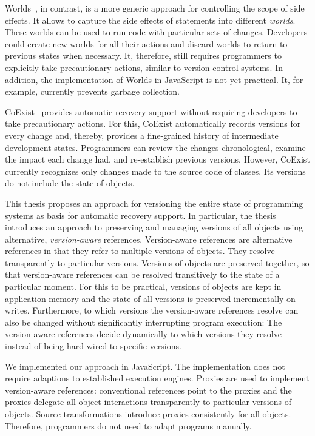 Worlds~\cite{Warth2011Wor}, in contrast, is a more generic approach for controlling the scope of side effects.
It allows to capture the side effects of statements into different \emph{worlds}.
These worlds can be used to run code with particular sets of changes.
Developers could create new worlds for all their actions and discard worlds to return to previous states when necessary.
It, therefore, still requires programmers to explicitly take precautionary actions, similar to version control systems.
In addition, the implementation of Worlds in JavaScript is not yet practical.
It, for example, currently prevents garbage collection.

CoExist~\cite{Steinert2012COE,Steinert2014EVA} provides automatic recovery support without requiring developers to take precautionary actions.
For this, CoExist automatically records versions for every change and, thereby, provides a fine-grained history of intermediate development states.
Programmers can review the changes chronological, examine the impact each change had, and re-establish previous versions.
However, CoExist currently recognizes only changes made to the source code of classes.
Its versions do not include the state of objects.

This thesis proposes an approach for versioning the entire state of programming systems as basis for automatic recovery support.
In particular, the thesis introduces an approach to preserving and managing versions of all objects using alternative, \emph{version-aware} references.
Version-aware references are alternative references in that they refer to multiple versions of objects.
They resolve transparently to particular versions.
Versions of objects are preserved together, so that version-aware references can be resolved transitively to the state of a particular moment.
For this to be practical, versions of objects are kept in application memory and the state of all versions is preserved incrementally on writes.
Furthermore, to which versions the version-aware references resolve can also be changed without significantly interrupting program execution:
The version-aware references decide dynamically to which versions they resolve instead of being hard-wired to specific versions.

We implemented our approach in JavaScript.
The implementation does not require adaptions to established execution engines.
Proxies are used to implement version-aware references: conventional references point to the proxies and the proxies delegate all object interactions transparently to particular versions of objects.
Source transformations introduce proxies consistently for all objects.
Therefore, programmers do not need to adapt programs manually.

